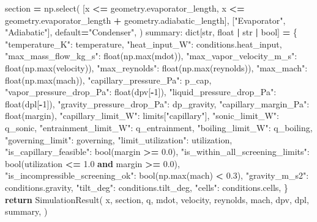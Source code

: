 \documentclass[
  12pt,a4paper,oneside]{report}
\newenvironment{Shaded}{\begin{snugshade}}{\end{snugshade}}
\newcommand{\BuiltInTok}[1]{#1}
\newcommand{\ControlFlowTok}[1]{\textcolor[rgb]{0.13,0.29,0.53}{\textbf{#1}}}
\newcommand{\DecValTok}[1]{\textcolor[rgb]{0.00,0.00,0.81}{#1}}
\newcommand{\FloatTok}[1]{\textcolor[rgb]{0.00,0.00,0.81}{#1}}
\newcommand{\KeywordTok}[1]{\textcolor[rgb]{0.13,0.29,0.53}{\textbf{#1}}}
\newcommand{\NormalTok}[1]{#1}
\newcommand{\OperatorTok}[1]{\textcolor[rgb]{0.81,0.36,0.00}{\textbf{#1}}}
\newcommand{\StringTok}[1]{\textcolor[rgb]{0.31,0.60,0.02}{#1}}
\begin{document}
\begin{Shaded}
\begin{Highlighting}[]
\NormalTok{    section }\OperatorTok{=}\NormalTok{ np.select(}
\NormalTok{        [x }\OperatorTok{\textless{}=}\NormalTok{ geometry.evaporator\_length,}
\NormalTok{         x }\OperatorTok{\textless{}=}\NormalTok{ geometry.evaporator\_length }\OperatorTok{+}\NormalTok{ geometry.adiabatic\_length],}
\NormalTok{        [}\StringTok{"Evaporator"}\NormalTok{, }\StringTok{"Adiabatic"}\NormalTok{], default}\OperatorTok{=}\StringTok{"Condenser"}\NormalTok{,}
\NormalTok{    )}
\NormalTok{    summary: }\BuiltInTok{dict}\NormalTok{[}\BuiltInTok{str}\NormalTok{, }\BuiltInTok{float} \OperatorTok{|} \BuiltInTok{str} \OperatorTok{|} \BuiltInTok{bool}\NormalTok{] }\OperatorTok{=}\NormalTok{ \{}
        \StringTok{"temperature\_K"}\NormalTok{: temperature,}
        \StringTok{"heat\_input\_W"}\NormalTok{: conditions.heat\_input,}
        \StringTok{"max\_mass\_flow\_kg\_s"}\NormalTok{: }\BuiltInTok{float}\NormalTok{(np.}\BuiltInTok{max}\NormalTok{(mdot)),}
        \StringTok{"max\_vapor\_velocity\_m\_s"}\NormalTok{: }\BuiltInTok{float}\NormalTok{(np.}\BuiltInTok{max}\NormalTok{(velocity)),}
        \StringTok{"max\_reynolds"}\NormalTok{: }\BuiltInTok{float}\NormalTok{(np.}\BuiltInTok{max}\NormalTok{(reynolds)),}
        \StringTok{"max\_mach"}\NormalTok{: }\BuiltInTok{float}\NormalTok{(np.}\BuiltInTok{max}\NormalTok{(mach)),}
        \StringTok{"capillary\_pressure\_Pa"}\NormalTok{: p\_cap,}
        \StringTok{"vapor\_pressure\_drop\_Pa"}\NormalTok{: }\BuiltInTok{float}\NormalTok{(dpv[}\OperatorTok{{-}}\DecValTok{1}\NormalTok{]),}
        \StringTok{"liquid\_pressure\_drop\_Pa"}\NormalTok{: }\BuiltInTok{float}\NormalTok{(dpl[}\OperatorTok{{-}}\DecValTok{1}\NormalTok{]),}
        \StringTok{"gravity\_pressure\_drop\_Pa"}\NormalTok{: dp\_gravity,}
        \StringTok{"capillary\_margin\_Pa"}\NormalTok{: }\BuiltInTok{float}\NormalTok{(margin),}
        \StringTok{"capillary\_limit\_W"}\NormalTok{: limits[}\StringTok{"capillary"}\NormalTok{],}
        \StringTok{"sonic\_limit\_W"}\NormalTok{: q\_sonic,}
        \StringTok{"entrainment\_limit\_W"}\NormalTok{: q\_entrainment,}
        \StringTok{"boiling\_limit\_W"}\NormalTok{: q\_boiling,}
        \StringTok{"governing\_limit"}\NormalTok{: governing,}
        \StringTok{"limit\_utilization"}\NormalTok{: utilization,}
        \StringTok{"is\_capillary\_feasible"}\NormalTok{: }\BuiltInTok{bool}\NormalTok{(margin }\OperatorTok{\textgreater{}=} \FloatTok{0.0}\NormalTok{),}
        \StringTok{"is\_within\_all\_screening\_limits"}\NormalTok{: }\BuiltInTok{bool}\NormalTok{(utilization }\OperatorTok{\textless{}=} \FloatTok{1.0} \KeywordTok{and}\NormalTok{ margin }\OperatorTok{\textgreater{}=} \FloatTok{0.0}\NormalTok{),}
        \StringTok{"is\_incompressible\_screening\_ok"}\NormalTok{: }\BuiltInTok{bool}\NormalTok{(np.}\BuiltInTok{max}\NormalTok{(mach) }\OperatorTok{\textless{}} \FloatTok{0.3}\NormalTok{),}
        \StringTok{"gravity\_m\_s2"}\NormalTok{: conditions.gravity,}
        \StringTok{"tilt\_deg"}\NormalTok{: conditions.tilt\_deg,}
        \StringTok{"cells"}\NormalTok{: conditions.cells,}
\NormalTok{    \}}
    \ControlFlowTok{return}\NormalTok{ SimulationResult(}
\NormalTok{        x, section, q, mdot, velocity, reynolds, mach, dpv, dpl, summary,}
\NormalTok{    )}



\end{Highlighting}
\end{Shaded}
\end{document}
